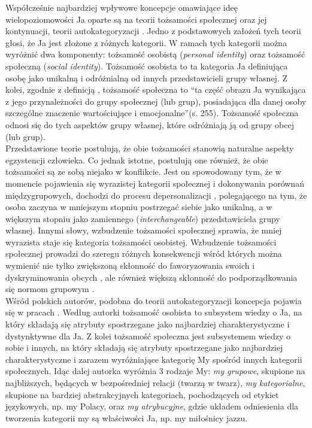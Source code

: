 \documentclass[man]{apa6}
\begin{document}
Współcześnie najbardziej wpływowe koncepcje omawiające ideę wielopoziomowości Ja oparte są na teorii tożsamości społecznej \parencite{tajfel1986social} oraz jej kontynuacji, teorii autokategoryzacji \parencite{turner1987rediscovering, turner1994self}. Jedno z podstawowych założeń tych teorii głosi, że Ja jest złożone z różnych kategorii. W ramach tych kategorii można wyróżnić dwa komponenty: tożsamość osobistą (\emph{personal identity}) oraz tożsamość społeczną (\emph{social identity}). Tożsamość osobista to ta kategoria Ja definiująca osobę jako unikalną i odróżnialną od innych przedstawicieli grupy własnej. Z kolei, zgodnie z definicją \textcite{tajfel1981human}, tożsamość społeczna to ``ta część obrazu Ja wynikająca z jego przynależności do grupy społecznej (lub grup), posiadająca dla danej osoby szczególne znaczenie wartościujące i emocjonalne''(s. 255). Tożsamość społeczna odnosi się do tych aspektów grupy własnej, które odróżniają ją od grupy obcej (lub grup).\\

Przedstawione teorie postulują, że obie tożsamości stanowią naturalne aspekty egzystencji człowieka. Co jednak istotne, postulują one również, że obie tożsamości są ze sobą niejako w konflikcie. Jest on spowodowany tym, że w momencie pojawienia się wyrazistej kategorii społecznej i dokonywania porównań międzygrupowych, dochodzi do procesu depersonalizacji \parencite[zob. np.,][]{turner1994self}, polegającego na tym, że osoba zaczyna w mniejszym stopniu postrzegać siebie jako unikalną, a w większym stopniu jako zamiennego (\emph{interchangeable}) przedstawiciela grupy własnej. Innymi słowy, wzbudzenie tożsamości społecznej sprawia, że mniej wyrazista staje się kategoria tożsamości osobistej. Wzbudzenie tożsamości społecznej prowadzi do szeregu różnych konsekwencji wśród których można wymienić nie tylko zwiększoną skłonność do faworyzowania swoich i dyskryminowania obcych \parencite{tajfel1986social}, ale również większą skłonność do podporządkowania się normom grupowym \parencite{reicher1995social}. \\

Wśród polskich autorów, podobna do teorii autokategoryzacji koncepcja pojawia się w pracach \textcite{jarymowicz1994poznawcza}. Według autorki tożsamość osobista to subsystem wiedzy o Ja, na który składają się atrybuty spostrzegane jako najbardziej charakterystyczne i dystynktywne dla Ja. Z kolei tożsamość społeczna jest subsystemem wiedzy o sobie i innych, na który składają się atrybuty spostrzegane jako najbardziej charakterystyczne i zarazem wyróżniające kategorię My spośród innych kategorii społecznych. Idąc dalej autorka wyróżnia 3 rodzaje My: \emph{my grupowe}, skupione na najbliższych, będących w bezpośredniej relacji (twarzą w twarz), \emph{my kategorialne},
skupione na bardziej abstrakcyjnych kategoriach, pochodzących od etykiet językowych, np. my Polacy, oraz \emph{my atrybucyjne}, gdzie układem odniesienia dla tworzenia kategorii my są właściwości Ja, np. my miłośnicy jazzu.\\
\end{document}
